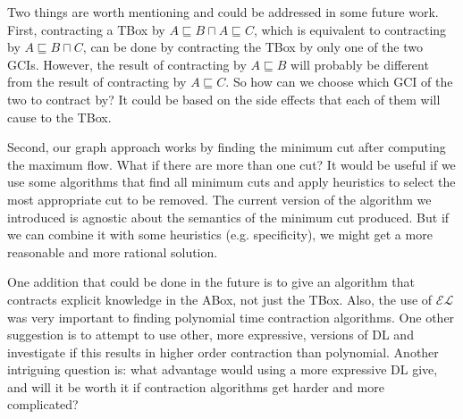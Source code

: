 Two things are worth mentioning and could be addressed in some future work. First, contracting a TBox by $A \sqsubseteq B \sqcap A \sqsubseteq C$, which is equivalent to contracting by $A \sqsubseteq B \sqcap C$, can be done by contracting the TBox by only one of the two GCIs. However, the result of contracting by $A \sqsubseteq B$ will probably be different from the result of contracting by $A \sqsubseteq C$. So how can we choose which GCI of the two to contract by? It could be based on the side effects that each of them will cause to the TBox.

Second, our graph approach works by finding the minimum cut after computing the maximum flow. What if there are more than one cut? It would be useful if we use some algorithms that find all minimum cuts and apply heuristics to select the most appropriate cut to be removed. The current version of the algorithm we introduced is agnostic about the semantics of the minimum cut produced. But if we can combine it with some heuristics (e.g. specificity), we might get a more reasonable and more rational solution.

One addition that could be done in the future is to give an algorithm that contracts explicit knowledge in the ABox, not just the TBox. Also, the use of $\mathcal{EL}$ was very important to finding polynomial time contraction algorithms. One other suggestion is to attempt to use other, more expressive, versions of DL and investigate if this results in higher order contraction than polynomial. Another intriguing question is: what advantage would using a more expressive DL give, and will it be worth it if contraction algorithms get harder and more complicated? 